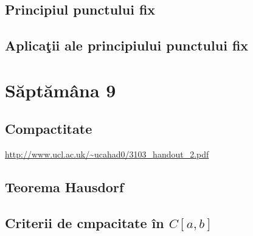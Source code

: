 \documentclass[a4paper,12pt]{article}
\theoremstyle{change}
\begin{document}
\subsection{Principiul punctului fix}

\subsection{Aplicaţii ale principiului  punctului fix}

\section{Săptămâna 9}


\subsection{Compactitate}

\url{http://www.ucl.ac.uk/~ucahad0/3103_handout_2.pdf}

\subsection{Teorema Hausdorf}


\subsection{Criterii de cmpacitate în $C[a,b]$}
\end{document}
